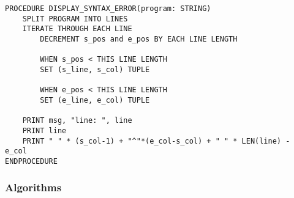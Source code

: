 \begin{lstlisting}
PROCEDURE DISPLAY_SYNTAX_ERROR(program: STRING)
    SPLIT PROGRAM INTO LINES
    ITERATE THROUGH EACH LINE 
        DECREMENT s_pos and e_pos BY EACH LINE LENGTH 

        WHEN s_pos < THIS LINE LENGTH 
        SET (s_line, s_col) TUPLE

        WHEN e_pos < THIS LINE LENGTH
        SET (e_line, e_col) TUPLE

    PRINT msg, "line: ", line
    PRINT line 
    PRINT " " * (s_col-1) + "^"*(e_col-s_col) + " " * LEN(line) - e_col
ENDPROCEDURE
\end{lstlisting}

\subsubsection{Algorithms}

